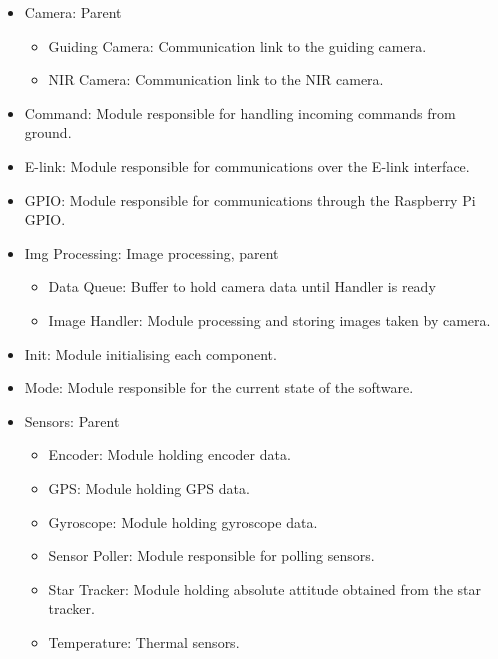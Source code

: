 \begin{itemize}

    \item Camera: Parent
        \begin{itemize}
            \item Guiding Camera: Communication link to the guiding camera.
            \item NIR Camera: Communication link to the NIR camera.
        \end{itemize}

    \item Command: Module responsible for handling incoming commands from ground.

    \item E-link: Module responsible for communications over the E-link interface.

    \item GPIO: Module responsible for communications through the Raspberry Pi GPIO.

    \item Img Processing: Image processing, parent
        \begin{itemize}
            \item Data Queue: Buffer to hold camera data until Handler is ready
            \item Image Handler: Module processing and storing images taken by camera.
        \end{itemize}

    \item Init: Module initialising each component.

    \item Mode: Module responsible for the current state of the software.

    \item Sensors: Parent
        \begin{itemize}
            \item Encoder: Module holding encoder data.
            \item GPS: Module holding GPS data.
            \item Gyroscope: Module holding gyroscope data.
             \item Sensor Poller: Module responsible for polling sensors.
            \item Star Tracker: Module holding absolute attitude obtained from the star tracker.
            \item Temperature: Thermal sensors.
        \end{itemize}


\end{itemize}
